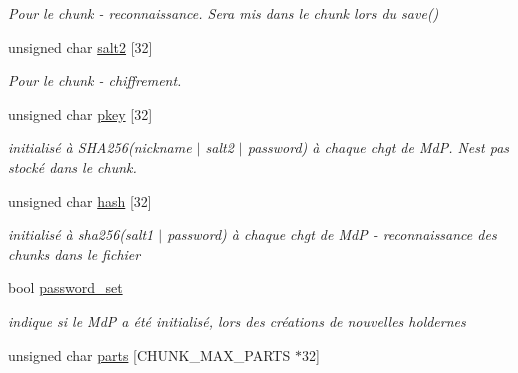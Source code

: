 \begin{DoxyCompactItemize}
\begin{DoxyCompactList}\small\item\em Pour le chunk -\/ reconnaissance. Sera mis dans le chunk lors du save() \end{DoxyCompactList}\item 
\mbox{\label{classt__holder_a948ebbd48f47f539c7a8d084e7dcf216}} 
unsigned char \hyperlink{classt__holder_a948ebbd48f47f539c7a8d084e7dcf216}{salt2} \mbox{[}32\mbox{]}
\begin{DoxyCompactList}\small\item\em Pour le chunk -\/ chiffrement. \end{DoxyCompactList}\item 
\mbox{\label{classt__holder_a3f1e5ce4676ad676ff7630d25a3f882c}} 
unsigned char \hyperlink{classt__holder_a3f1e5ce4676ad676ff7630d25a3f882c}{pkey} \mbox{[}32\mbox{]}
\begin{DoxyCompactList}\small\item\em initialisé à S\+H\+A256(nickname $\vert$ salt2 $\vert$ password) à chaque chgt de MdP. N\textquotesingle{}est pas stocké dans le chunk. \end{DoxyCompactList}\item 
\mbox{\label{classt__holder_af3297af4386544c09f00902e76f7d8ec}} 
unsigned char \hyperlink{classt__holder_af3297af4386544c09f00902e76f7d8ec}{hash} \mbox{[}32\mbox{]}
\begin{DoxyCompactList}\small\item\em initialisé à sha256(salt1 $\vert$ password) à chaque chgt de MdP -\/ reconnaissance des chunks dans le fichier \end{DoxyCompactList}\item 
\mbox{\label{classt__holder_ad407a00366aadc652d9f77bfeaf95bdf}} 
bool \hyperlink{classt__holder_ad407a00366aadc652d9f77bfeaf95bdf}{password\+\_\+set}
\begin{DoxyCompactList}\small\item\em indique si le MdP a été initialisé, lors des créations de nouvelles holdernes \end{DoxyCompactList}\item 
\mbox{\label{classt__holder_a9f6d3baa5ff22f741c0bcc12088c65e8}} 
unsigned char \hyperlink{classt__holder_a9f6d3baa5ff22f741c0bcc12088c65e8}{parts} \mbox{[}C\+H\+U\+N\+K\+\_\+\+M\+A\+X\+\_\+\+P\+A\+R\+TS $\ast$32\mbox{]}

\end{DoxyCompactItemize}
